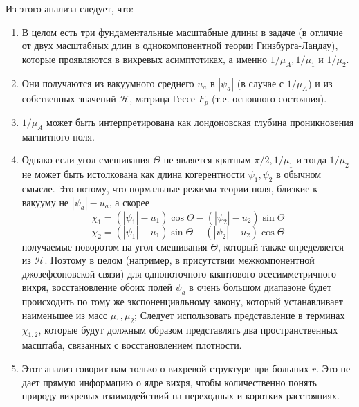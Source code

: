 Из этого анализа следует, что:
\begin{enumerate}
    \item В целом есть три фундаментальные масштабные длины в задаче (в 
        отличие от двух масштабных длин в однокомпонентной теории 
        Гинзбурга-Ландау), которые проявляются в вихревых асимптотиках, а 
        именно \( 1/\mu_A, 1/\mu_1 \) и \( 1/\mu_2 \).
    \item Они получаются из вакуумного среднего \( u_a \) в \( |\psi_a| \) 
        (в случае с \( 1/\mu_A \)) и из собственных значений 
        \( \mathcal{H} \), матрица Гессе \( F_p \) (т.е. основного состояния).
    \item \( 1/\mu_{A} \) может быть интерпретирована как лондоновская глубина 
        проникновения магнитного поля.
    \item Однако если угол смешивания \( \Theta \) не является кратным  
        \( \pi/2, 1/\mu_1 \) и тогда \( 1/\mu_2 \) не может быть истолкована 
        как длина когерентности \( \psi_1, \psi_2 \) в обычном смысле. Это 
        потому, что нормальные режимы теории поля, близкие к вакууму не 
        \( |\psi_a| - u_a \), а скорее
        \[ 
            \chi_1 = (|\psi_1| - u_1)\cos\Theta - (|\psi_2| - u_2)\sin\Theta 
        \]
        \[ 
            \chi_2 = (|\psi_1| - u_1)\sin\Theta - (|\psi_2| - u_2)\cos\Theta 
        \]
        получаемые поворотом на угол смешивания \( \Theta \), который также 
        определяется из \( \mathcal{H} \). Поэтому в целом (например, в 
        присутствии межкомпонентной джозефсоновской связи) для однопоточного
        квантового осесимметричного вихря, восстановление обоих полей
        \( \psi_a \) в очень большом диапазоне будет происходить по тому же 
        экспоненциальному закону, который устанавливает наименьшее из масс 
        \( \mu_1, \mu_2 \); Следует использовать представление в терминах 
        \( \chi_{1,2} \), которые будут должным образом представлять два 
        пространственных масштаба, связанных с восстановлением плотности.
    \item Этот анализ говорит нам только о вихревой структуре при больших
        \( r \). Это не дает прямую информацию о ядре вихря, чтобы 
        количественно понять природу вихревых взаимодействий на переходных 
        и коротких расстояниях.
\end{enumerate}

